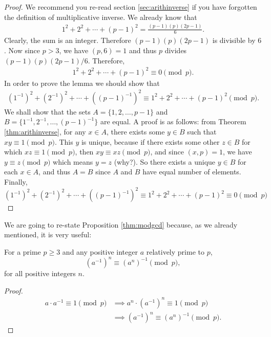 \documentclass[12pt]{subfile}
\begin{document}
		\begin{proof}
			We recommend you re-read section \eqref{sec:arithinverse} if you have forgotten the definition of multiplicative inverse. We already know that
				\begin{align*}
					1^2+2^2+\cdots+(p-1)^2 = \frac{(p-1)(p)(2p-1)}{6}.
				\end{align*}
			Clearly, the sum is an integer. Therefore $(p-1)(p)(2p-1)$ is divisible by $6$. Now since $p>3$, we have $(p,6)=1$ and thus $p$ divides $(p-1)(p)(2p-1)/6$. Therefore,
				\begin{align*}
					1^2+2^2+\cdots+(p-1)^2 \equiv 0 \pmod p.
				\end{align*}
			In order to prove the lemma we should show that
				\begin{align*}
					(1^{-1})^2+(2^{-1})^2+\cdots+((p-1)^{-1})^2 \equiv 1^2+2^2+\cdots+(p-1)^2 \pmod p.
				\end{align*}
			We shall show that the sets $A=\{1,2,\ldots,p-1\}$ and $B=\{1^{-1}, 2^{-1},\ldots,(p-1)^{-1}\}$ are equal. A proof is as follows: from Theorem \ref{thm:arithinverse}, for any $x \in A$, there exists some $y \in B$ such that $xy \equiv 1 \pmod p$. This $y$ is unique, because if there exists some other $z \in B$ for which $xz \equiv 1 \pmod p$, then $xy \equiv xz \pmod p$, and since $(x,p)=1$, we have $y \equiv z \pmod p$ which means $y=z$ (why?). So there exists a unique $y\in B$ for each $x \in A$, and thus $A=B$ since $A$ and $B$ have equal number of elements. Finally,
				\begin{equation*}
					(1^{-1})^2+(2^{-1})^2+\cdots+((p-1)^{-1})^2 \equiv 1^2+2^2+\cdots+(p-1)^2 \equiv 0 \pmod p
				\end{equation*}
		\end{proof}
	We are going to re-state Proposition \ref{thm:modgcd} because, as we already mentioned, it is very useful:
		\begin{lemma}\label{lem:wolstproof3}
			For a prime $p\geq 3$ and any positive integer $a$ relatively prime to $p$,
			\[ (a^{-1})^n \equiv (a^n)^{-1} \pmod p,\]
			for all positive integers $n$.
		\end{lemma}
		
		\begin{proof}
			\begin{align*}
				a \cdot a^{-1} \equiv 1 \pmod p &\implies a^n \cdot (a^{-1})^n \equiv 1 \pmod p\\
				&\implies (a^{-1})^n \equiv (a^n)^{-1} \pmod p.
			\end{align*}
			
		\end{proof}
	
\end{document}
